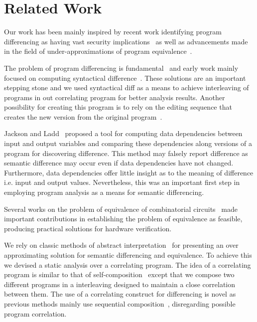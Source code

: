 \section{Related Work} 

Our work has been mainly inspired by recent work identifying program differencing as having vast security implications~\cite{BrumleyPoosankamSongZheng08,SongSunZhang09} as well as advancements made in the field of under-approximations of program equivalence~\cite{GodlinStrichman09,KawaguchiLahiriRebelo10,DwyerElbaumPerson08,EnglerRamos11}.

The problem of program differencing is fundamental~\cite{Hoare69} and early work mainly focused on computing syntactical difference~\cite{HuntMcIlroy75}. These solutions are an important stepping stone and we used syntactical diff as a means to achieve interleaving of programs in out correlating program for better analysis results. Another possibility for creating this program is to rely on the editing sequence that creates the new version from the original program~\cite{Horwitz90}.

Jackson and Ladd~\cite{JacksonLadd94} proposed a tool for computing data dependencies between input and output variables and comparing these dependencies along versions of a program for discovering difference. This method may falsely report difference as semantic difference may occur even if data dependencies have not changed. Furthermore, data dependencies offer little insight as to the meaning of difference i.e. input and output values. Nevertheless, this was an important first step in employing program analysis as a means for semantic differencing.

Several works on the problem of equivalence of combinatorial circuits~\cite{KuehlmannKrohm97,BraytonChatterjeeMishchenkoEen06,ClarkeKroening03} made important contributions in establishing the problem of equivalence as feasible, producing practical solutions for hardware verification.

We rely on classic methods of abstract interpretation~\cite{CousotCousot77} for presenting an over approximating solution for semantic differencing and equivalence. To achieve this we devised a static analysis over a correlating program. The idea of a correlating program is similar to that of self-composition~\cite{AikenTerauchi05} except that we compose two different programs in a interleaving designed to maintain a close correlation between them. The use of a correlating construct for differencing is novel as previous methods mainly use sequential composition~\cite{GodlinStrichman09,DwyerElbaumPerson08,EnglerRamos11}, disregarding possible program correlation.

